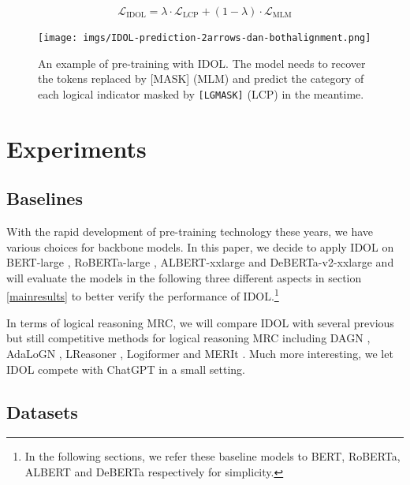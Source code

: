 \documentclass[11pt]{article}
\begin{document}
\begin{equation}
\begin{aligned}
\mathcal{L}_{\textrm{IDOL}} = \lambda \cdot	\mathcal{L}_{\textrm{LCP}} + (1-\lambda) \cdot\mathcal{L}_{\textrm{MLM}} \label{idollossfunction}
\end{aligned}
\end{equation}


\begin{figure}
\centering
\texttt{[image: imgs/IDOL-prediction-2arrows-dan-bothalignment.png]}
\caption{An example of pre-training with IDOL. The model needs to recover the tokens replaced by [MASK] (MLM) and predict the category of each logical indicator masked by \texttt{[LGMASK]} (LCP) in the meantime.}
\label{fig:idolcase}
\end{figure}




\section{Experiments}

\subsection{Baselines}

With the rapid development of pre-training technology these years, we have various choices for backbone models. In this paper, we decide to apply IDOL on BERT-large \cite{bert}, RoBERTa-large \cite{roberta}, ALBERT-xxlarge \cite{albert} and DeBERTa-v2-xxlarge \cite{deberta} and will evaluate the models in the following three different aspects in section \ref{mainresults} to better verify the performance of IDOL.\footnote{In the following sections, we refer these baseline models to BERT, RoBERTa, ALBERT and DeBERTa respectively for simplicity.} 

In terms of logical reasoning MRC, we will compare IDOL with several previous but still competitive methods for logical reasoning MRC including DAGN \cite{huang-etal-2021-dagn}, AdaLoGN \cite{li-etal-2022-adalogn}, LReasoner \cite{wang-etal-2022-logic}, Logiformer \cite{logiformer} and MERIt \cite{jiao-etal-2022-merit}. Much more interesting, we let IDOL compete with ChatGPT in a small setting.

\subsection{Datasets}
\end{document}
